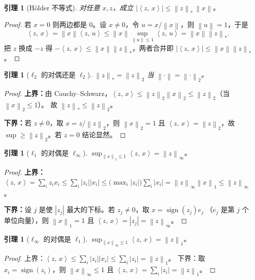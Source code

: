 \documentclass[11pt,a4paper,UTF8]{ctexart}
\theoremstyle{plain}
\newtheorem{lemma}[theorem]{引理}
\theoremstyle{definition}
\theoremstyle{remark}
\newcommand{\norm}[1]{\left\lVert #1 \right\rVert}
\newcommand{\abs}[1]{\left\lvert #1 \right\rvert}
\newcommand{\inner}[2]{\left\langle #1,\, #2 \right\rangle}
\DeclareMathOperator{\sign}{sign}
\begin{document}
\begin{lemma}[Hölder 不等式]\label{lem:holder}
对任意 $x,z$，成立 $\abs{\inner{z}{x}}\le\norm{z}_{\ast}\,\norm{x}$。
\end{lemma}

\begin{proof}
若 $x=0$ 则两边都是 $0$。设 $x\neq 0$，令 $u=x/\norm{x}$，则 $\norm{u}=1$，于是
\[
\inner{z}{x}=\norm{x}\inner{z}{u}\le\norm{x}\sup_{\norm{u}\le 1}\inner{z}{u}=\norm{x}\norm{z}_{\ast}.
\]
把 $z$ 换成 $-z$ 得 $-\inner{z}{x}\le\norm{x}\norm{z}_\ast$，两者合并即 $\abs{\inner{z}{x}}\le\norm{x}\norm{z}_\ast$。
\end{proof}

\begin{lemma}[$\ell_2$ 的对偶还是 $\ell_2$]\label{lem:dual2}
$\norm{z}_{\ast}=\norm{z}_2$ 当 $\norm{\cdot}=\norm{\cdot}_2$。
\end{lemma}

\begin{proof}
\textbf{上界：}由 Cauchy--Schwarz，$\inner{z}{x}\le\norm{z}_2\norm{x}_2\le\norm{z}_2$（当 $\norm{x}_2\le1$）。
故 $\norm{z}_\ast\le\norm{z}_2$。

\textbf{下界：}若 $z\neq0$，取 $x=z/\norm{z}_2$，则 $\norm{x}_2=1$ 且
$\inner{z}{x}=\norm{z}_2$，故 $\sup\ge\norm{z}_2$。若 $z=0$ 结论显然。
\end{proof}

\begin{lemma}[$\ell_1$ 的对偶是 $\ell_\infty$]\label{lem:dual1}
$\sup_{\norm{x}_1\le 1}\inner{z}{x}=\norm{z}_\infty$。
\end{lemma}

\begin{proof}
\textbf{上界：}$\inner{z}{x}=\sum_i z_ix_i\le\sum_i\abs{z_i}\abs{x_i}
\le\bigl(\max_i\abs{z_i}\bigr)\sum_i\abs{x_i}=\norm{z}_\infty\norm{x}_1\le\norm{z}_\infty$。

\textbf{下界：}设 $j$ 是使 $\abs{z_j}$ 最大的下标。若 $z_j\neq0$，取 $x=\sign(z_j)e_j$
（$e_j$ 是第 $j$ 个单位向量），则 $\norm{x}_1=1$ 且 $\inner{z}{x}=\abs{z_j}=\norm{z}_\infty$。
\end{proof}

\begin{lemma}[$\ell_\infty$ 的对偶是 $\ell_1$]\label{lem:dualinf}
$\sup_{\norm{x}_\infty\le 1}\inner{z}{x}=\norm{z}_1$。
\end{lemma}

\begin{proof}
上界：$\inner{z}{x}\le\sum_i\abs{z_i}\abs{x_i}\le\sum_i\abs{z_i}=\norm{z}_1$。
下界：取 $x_i=\sign(z_i)$，则 $\norm{x}_\infty\le 1$ 且 $\inner{z}{x}=\sum_i\abs{z_i}=\norm{z}_1$。
\end{proof}
\end{document}
